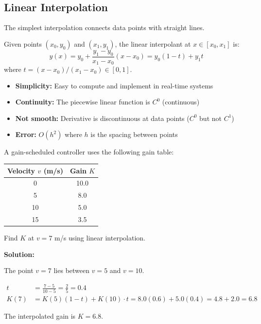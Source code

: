 

\subsection{Linear Interpolation}

The simplest interpolation connects data points with straight lines.

\begin{definitionbox}[title=Definition 11.15: Linear Interpolation]
Given points $(x_0, y_0)$ and $(x_1, y_1)$, the linear interpolant at $x \in [x_0, x_1]$ is:
\begin{equation}
\boxed{y(x) = y_0 + \frac{y_1 - y_0}{x_1 - x_0}(x - x_0) = y_0(1-t) + y_1 t}
\end{equation}
where $t = (x - x_0)/(x_1 - x_0) \in [0, 1]$.
\end{definitionbox}

\begin{keyconceptbox}[title=Properties of Linear Interpolation]
\begin{itemize}
    \item \textbf{Simplicity:} Easy to compute and implement in real-time systems
    \item \textbf{Continuity:} The piecewise linear function is $C^0$ (continuous)
    \item \textbf{Not smooth:} Derivative is discontinuous at data points ($C^0$ but not $C^1$)
    \item \textbf{Error:} $O(h^2)$ where $h$ is the spacing between points
\end{itemize}
\end{keyconceptbox}

\begin{examplebox}[title=Example 11.10: Linear Interpolation for Gain Scheduling]
A gain-scheduled controller uses the following gain table:

\begin{center}
\begin{tabular}{cc}
\toprule
Velocity $v$ (m/s) & Gain $K$ \\
\midrule
0 & 10.0 \\
5 & 8.0 \\
10 & 5.0 \\
15 & 3.5 \\
\bottomrule
\end{tabular}
\end{center}

Find $K$ at $v = 7$ m/s using linear interpolation.

\textbf{Solution:}

The point $v = 7$ lies between $v = 5$ and $v = 10$.

\begin{align}
t &= \frac{7 - 5}{10 - 5} = \frac{2}{5} = 0.4 \\
K(7) &= K(5)(1 - t) + K(10) \cdot t = 8.0(0.6) + 5.0(0.4) = 4.8 + 2.0 = 6.8
\end{align}

The interpolated gain is $K = 6.8$.
\end{examplebox}

